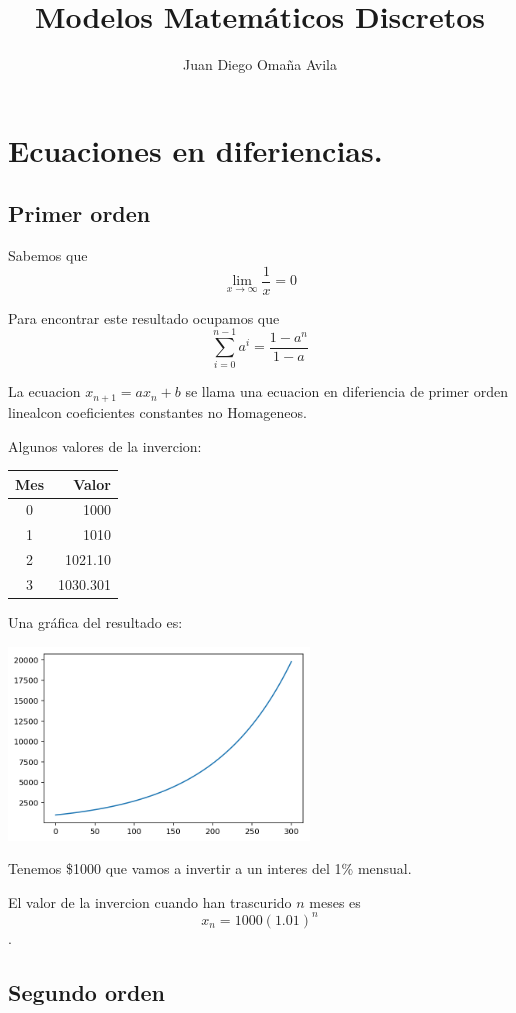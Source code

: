 \documentclass{article}
\title{Modelos Matemáticos Discretos}
\author{Juan Diego Omaña Avila}
\begin{document}
\maketitle
\section{Ecuaciones en diferiencias.}
\subsection{Primer orden}
Sabemos que $$\lim_{x\to\infty}\frac{1}{x}=0$$

Para encontrar este resultado ocupamos que $$\sum_{i=0}^{n-1}a^i=\frac{1-a^{n}}{1-a}$$

La ecuacion $x_{n+1}=ax_n+b$ se llama una ecuacion en diferiencia de primer orden linealcon coeficientes constantes no Homageneos.

Algunos valores de la invercion:
\begin{center}
\begin{tabular}{|c|r|}
\hline
Mes & Valor\\
\hline
0 & 1000 \\
1 & 1010 \\
2 & 1021.10 \\
3 & 1030.301 \\
\hline
\end{tabular}
\end{center}

Una gráfica del resultado es:

\begin{center}
\includegraphics[width=8cm]{GRAFICA}
\end{center}

Tenemos \$1000 que vamos a invertir a un interes del 1\% mensual.

El valor de la invercion cuando han trascurido $n$ meses es $$x_n=1000(1.01)^n$$.
\subsection{Segundo orden}
\end{document}
